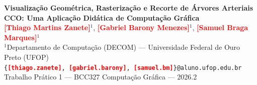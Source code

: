 \documentclass[11pt, a4paper]{article}
\newcommand{\todo}[1]{\textcolor{red}{\textbf{[#1]}}}
\begin{document}
\begin{center}
  {\LARGE \bfseries \textcolor{ufopred}{Visualização Geométrica, Rasterização e Recorte de Árvores Arteriais CCO: Uma Aplicação Didática de Computação Gráfica}}\\[0.4cm]

  {\large
    \textbf{\todo{Thiago Martins Zanete}}$^{1}$,
    \textbf{\todo{Gabriel Barony Menezes}}$^{1}$,
    \textbf{\todo{Samuel Braga Marques}}$^{1}$
  }\\[0.2cm]

  {\small
    $^{1}$Departamento de Computação (DECOM) --- Universidade Federal de Ouro Preto (UFOP)\\[0.1cm]
    \texttt{\{\todo{thiago.zanete}, \todo{gabriel.barony}, \todo{samuel.bm}\}@aluno.ufop.edu.br}
  }\\[0.2cm]

  {\small Trabalho Prático 1 --- BCC327 Computação Gráfica --- 2026.2}
\end{center}

\vspace{0.4cm}
\end{document}
